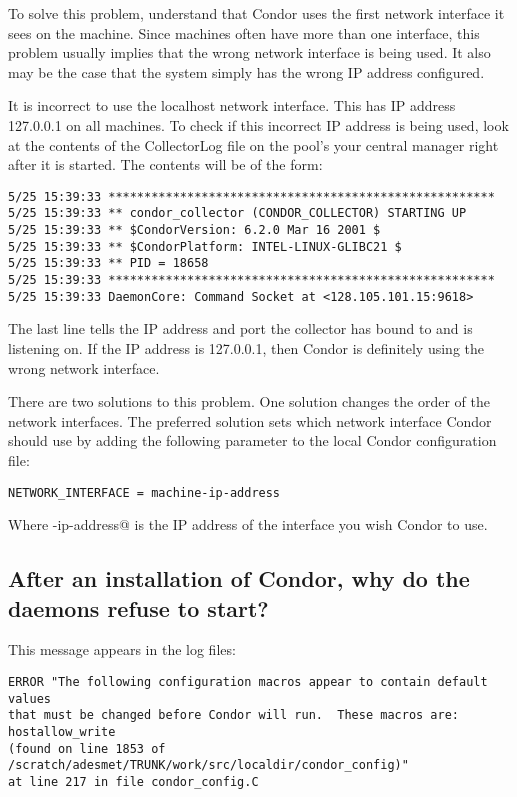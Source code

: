 To solve this problem, understand that
Condor uses the first network interface it sees on the machine.
Since machines often have more than one interface,
this problem usually implies that the wrong network
interface is being used.  It also may be the case that
the system simply has the wrong IP address configured.

It is incorrect to use the localhost network interface.
This has IP address 127.0.0.1 on all machines.
To check if this incorrect IP address is being used,
look at the contents of the
CollectorLog file on the pool's
your central manager right after it is started.  
The contents will be of the form:

\footnotesize
\begin{verbatim}
5/25 15:39:33 ******************************************************
5/25 15:39:33 ** condor_collector (CONDOR_COLLECTOR) STARTING UP
5/25 15:39:33 ** $CondorVersion: 6.2.0 Mar 16 2001 $
5/25 15:39:33 ** $CondorPlatform: INTEL-LINUX-GLIBC21 $
5/25 15:39:33 ** PID = 18658
5/25 15:39:33 ******************************************************
5/25 15:39:33 DaemonCore: Command Socket at <128.105.101.15:9618>
\end{verbatim}
\normalsize

The last line tells the IP address and port the collector has
bound to and is listening on.
If the IP address is 127.0.0.1, then Condor is definitely using the wrong
network interface.

There are two solutions to this problem.
One solution changes the order of the network interfaces.
The preferred solution
sets which network interface Condor should use
by adding the following parameter to the
local Condor configuration file:

\begin{verbatim}
NETWORK_INTERFACE = machine-ip-address
\end{verbatim}

Where \verb@machine-ip-address@ is the IP address of the interface you wish
Condor to use.

\subsection*{After an installation of Condor, why do the daemons refuse to start?}

This message appears in the log files:
\footnotesize
\begin{verbatim}
ERROR "The following configuration macros appear to contain default values 
that must be changed before Condor will run.  These macros are:
hostallow_write 
(found on line 1853 of /scratch/adesmet/TRUNK/work/src/localdir/condor_config)"
at line 217 in file condor_config.C
\end{verbatim}
\normalsize

